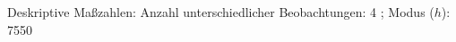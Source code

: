 				\label{tableValues:cjob049_g1}
				\vspace*{-\baselineskip}
                    \begin{noten}
                	    \note{} Deskriptive Maßzahlen:
                	    Anzahl unterschiedlicher Beobachtungen: 4%
                	    ; 
                	      Modus ($h$): 7550
                     \end{noten}


